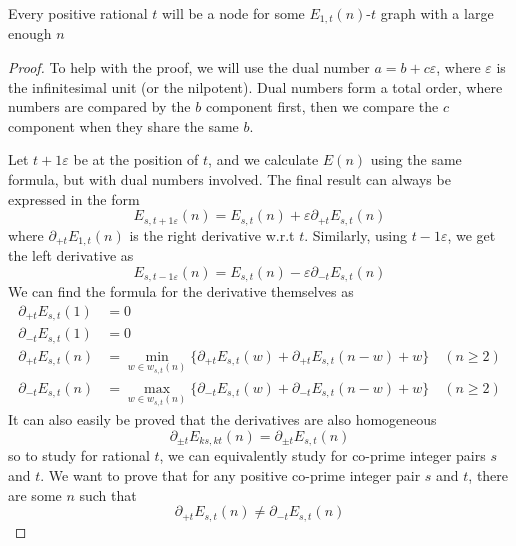 \documentclass[]{article}
\begin{document}
\vspace{1cm}
\begin{lemma}[Node] 
	Every positive rational $t$ will be a node for some $E_{1,t}(n)$-$t$ graph with a large enough $n$
\end{lemma}
\begin{proof}
	To help with the proof, we will use the dual number $a = b + c\varepsilon $, where $\varepsilon$ is the infinitesimal unit (or the nilpotent). Dual numbers form a total order, where numbers are compared by the $b$ component first, then we compare the $c$ component when they share the same $b$. 
	
	Let $t + 1\varepsilon$ be at the position of $t$, and we calculate $E(n)$ using the same formula, but with dual numbers involved. The final result can always be expressed in the form
	\[
	E_{s,t + 1\varepsilon}(n) = E_{s,t}(n) + \varepsilon \partial_{+t}E_{s,t}(n) 
	\]
	where $\partial_{+t}E_{1,t}(n)  $ is the right derivative w.r.t $t$. Similarly, using $t - 1\varepsilon$, we get the left derivative as 
	\[
	E_{s,t - 1\varepsilon}(n) = E_{s,t}(n) - \varepsilon \partial_{-t}E_{s,t}(n) 
	\]
	We can find the formula for the derivative themselves as
	\begin{align*}
	\partial_{+t}E_{s,t}(1) &= 0\\
	 \partial_{-t}E_{s,t}(1) &= 0 \\
	 \partial_{+t}E_{s,t}(n) &= \min_{w\in w_{s,t}(n)}\{\partial_{+t}E_{s,t}(w) + \partial_{+t}E_{s,t}(n-w) + w\} \quad(n\geq 2)\\
	 \partial_{-t}E_{s,t}(n) &= \max_{w\in w_{s,t}(n)}\{\partial_{-t}E_{s,t}(w) + \partial_{-t}E_{s		,t}(n-w) + w\} \quad(n\geq 2)
	\end{align*}
	It can also easily be proved that the derivatives are also homogeneous
	\[
	\partial_{\pm t}E_{ks,kt}(n) = \partial_{\pm t}E_{s,t}(n)
	\]
	so to study for rational $t$, we can equivalently study for co-prime integer pairs $s$ and $t$. We want to prove that for any positive co-prime integer pair $s$ and $t$, there are some $n$ such that
	\[
	\partial_{+t}E_{s,t}(n) \neq \partial_{-t}E_{s,t}(n) 
	\]
	

\end{proof}
\end{document}
